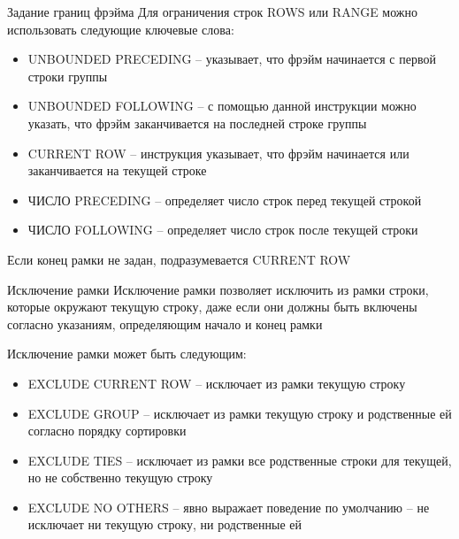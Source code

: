 \documentclass[12pt]{article}
\begin{document}
\begin{nota}{Задание границ фрэйма}
    Для ограничения строк ROWS или RANGE можно использовать следующие ключевые слова: 

    \begin{itemize}
        \item UNBOUNDED PRECEDING -- указывает, что фрэйм начинается с первой строки группы 
        \item UNBOUNDED FOLLOWING -- с помощью данной инструкции можно указать, что фрэйм заканчивается на последней строке группы
        \item CURRENT ROW -- инструкция указывает, что фрэйм начинается или заканчивается на текущей строке
        \item ЧИСЛО PRECEDING -- определяет число строк перед текущей строкой 
        \item ЧИСЛО FOLLOWING -- определяет число строк после текущей строки
    \end{itemize}

    Если конец рамки не задан, подразумевается CURRENT ROW 
\end{nota}

\begin{nota}{Исключение рамки}
    Исключение рамки позволяет исключить из рамки строки, которые окружают текущую строку, даже если они должны быть включены согласно указаниям, определяющим начало и конец рамки 

    Исключение рамки может быть следующим:

    \begin{itemize}
        \item EXCLUDE CURRENT ROW -- исключает из рамки текущую строку
        \item EXCLUDE GROUP -- исключает из рамки текущую строку и родственные ей согласно порядку сортировки 
        \item EXCLUDE TIES -- исключает из рамки все родственные строки для текущей, но не собственно текущую строку
        \item EXCLUDE NO OTHERS -- явно выражает поведение по умолчанию -- не исключает ни текущую строку, ни родственные ей 
    \end{itemize}
\end{nota}
\end{document}
